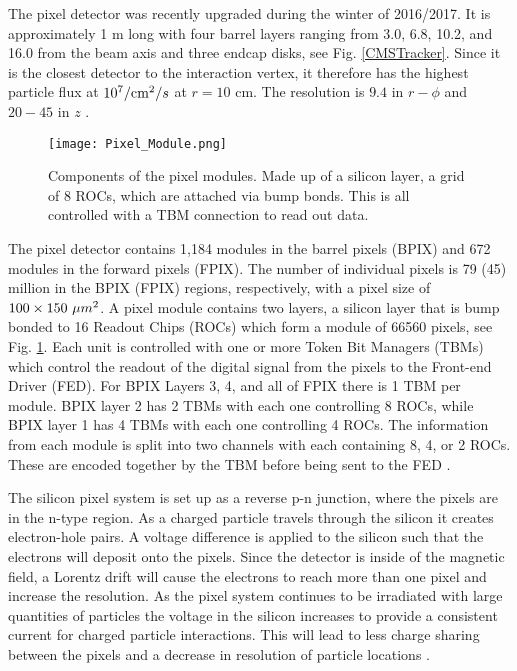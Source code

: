 The pixel detector was recently upgraded during the winter of 2016/2017. It is approximately 1 m long with four barrel layers ranging from 3.0, 6.8, 10.2, and 16.0 \cm{} from the beam axis and three endcap disks, see Fig. \ref{CMSTracker}. Since it is the closest detector to the interaction vertex, it therefore has the highest particle flux at $10^7/\text{cm}^2/s$ at $r=10$ cm. The resolution is $9.4$ \mum{} in $r-\phi$ and $20-45$ \mum{} in $z$ \cite{noauthor_cms_2012}.

\begin{figure}
 	\centering
	\texttt{[image: Pixel\_Module.png]}
 	\caption[Pixel Modules]{Components of the pixel modules. Made up of a silicon layer, a grid of 8 ROCs, which are attached via bump bonds. This is all controlled with a TBM connection to read out data.}
 	\label{PixelModule} 
\end{figure}

The pixel detector contains 1,184 modules in the barrel pixels (BPIX) and 672 modules in the forward pixels (FPIX). The number of individual pixels is 79 (45) million in the BPIX (FPIX) regions, respectively, with a pixel size of $100\times150 \text{ }\text{}\mu m^2$. A pixel module contains two layers, a silicon layer that is bump bonded to 16 Readout Chips (ROCs) which form a module of 66560 pixels, see Fig. \ref{PixelModule}. Each unit is controlled with one or more Token Bit Managers (TBMs) which control the readout of the digital signal from the pixels to the Front-end Driver (FED). For BPIX Layers 3, 4, and all of FPIX there is 1 TBM per module. BPIX layer 2 has 2 TBMs with each one controlling 8 ROCs, while BPIX layer 1 has 4 TBMs with each one controlling 4 ROCs. The information from each module is split into two channels with each containing 8, 4, or 2 ROCs. These are encoded together by the TBM before being sent to the FED \cite{noauthor_cms_2012}.

The silicon pixel system is set up as a reverse p-n junction, where the pixels are in the n-type region. As a charged particle travels through the silicon it creates electron-hole pairs. A voltage difference is applied to the silicon such that the electrons will deposit onto the pixels. Since the detector is inside of the magnetic field, a Lorentz drift will cause the electrons to reach more than one pixel and increase the resolution. As the pixel system continues to be irradiated with large quantities of particles the voltage in the silicon increases to provide a consistent current for charged particle interactions. This will lead to less charge sharing between the pixels and a decrease in resolution of particle locations \cite{noauthor_cms_2012}. 

